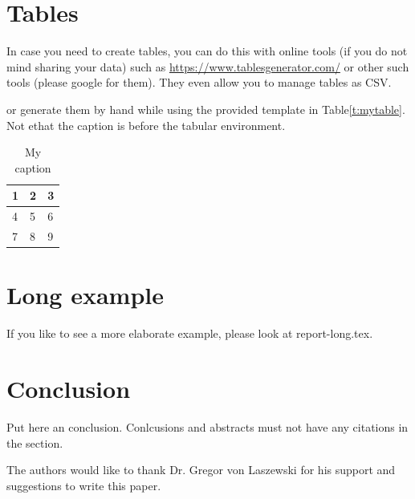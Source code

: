 \documentclass[sigconf]{acmart}
\begin{document}
\section{Tables}

In case you need to create tables, you can do this with online tools
(if you do not mind sharing your data) such as
\url{https://www.tablesgenerator.com/} or other such tools (please
google for them). They even allow you to manage tables as CSV.

or generate them by hand while using the provided template in Table\ref{t:mytable}. Not ethat
the caption is before the tabular environment.

\begin{table}[htb]
\centering
\caption{My caption}
\label{t:mytabble}
\begin{tabular}{lll}
1 & 2 & 3 \\
\hline
4 & 5 & 6 \\
7 & 8 & 9
\end{tabular}
\end{table}

\section{Long example}

If you like to see a more elaborate example, please look at
report-long.tex. 

\section{Conclusion}

Put here an conclusion. Conlcusions and abstracts must not have any
citations in the section.


\begin{acks}

  The authors would like to thank Dr. Gregor von Laszewski for his
  support and suggestions to write this paper.

\end{acks}


 
\end{document}
